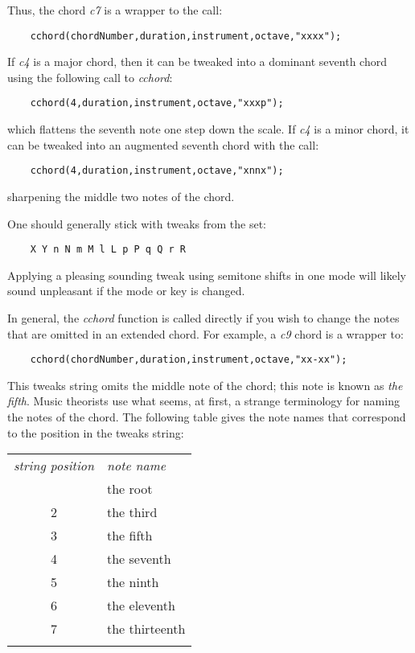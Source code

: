 \documentclass{article}
\begin{document}
Thus, the chord {\it c7} is a wrapper to the call:

\begin{verbatim}
    cchord(chordNumber,duration,instrument,octave,"xxxx");
\end{verbatim}

If {\it c4} is a major chord,
then it can be tweaked into a dominant seventh chord
using the following call to {\it cchord}:

\begin{verbatim}
    cchord(4,duration,instrument,octave,"xxxp");
\end{verbatim}

which flattens the seventh note one step down the scale.
If {\it c4} is a minor chord,
it can be tweaked into an augmented seventh chord with the call:

\begin{verbatim}
    cchord(4,duration,instrument,octave,"xnnx");
\end{verbatim}

sharpening the middle two notes of the chord.

One should generally stick with tweaks from the set:

\begin{verbatim}
    X Y n N m M l L p P q Q r R
\end{verbatim}

Applying a pleasing sounding tweak using semitone shifts
in one mode will
likely sound unpleasant if the mode or key is changed.

In general, the {\it cchord} function is called directly if you
wish to change the notes that are omitted in an extended chord.
For example, a {\it c9} chord is a wrapper to:

\begin{verbatim}
    cchord(chordNumber,duration,instrument,octave,"xx-xx");
\end{verbatim}

This tweaks string omits the middle note of the chord; this note
is known as {\it the fifth}.
Music theorists use what seems, at first, a strange terminology
for naming the notes of the chord. The following table gives
the note names that correspond to the position in the tweaks string:

\begin{tabular}{cl}%
\T\toprule
{\it string position} & {\it note name} \\
\T\midrule
1           & the root\\
2           & the third \\
3           & the fifth \\
4           & the seventh \\
5           & the ninth \\
6           & the eleventh \\
7           & the thirteenth \\
\T\bottomrule
\end{tabular}
\end{document}
